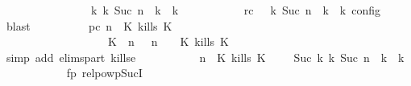 \begin{isabellebody}
\ \ \ \ \ \ \ \ \ \ \ \ \ \ \ \ {\isasymhookrightarrow}\isactrlbsup k\isactrlesup \ {\isacharparenleft}{\isasymGamma}\isactrlsub k{\isacharcomma}\ Suc\ n\ {\isasymturnstile}\ {\isasymPsi}\isactrlsub k\ {\isasymtriangleright}\ {\isasymPhi}\isactrlsub k{\isacharparenright}{\isacharparenright}{\isacartoucheclose}\isanewline
\ \ \ \ \ \ \ \ \ \ \ rc{\isacharcolon}{\isacartoucheopen}{\isasymrho}\ {\isasymin}\ {\isasymlbrakk}\ {\isasymGamma}\isactrlsub k{\isacharcomma}\ Suc\ n\ {\isasymturnstile}\ {\isasymPsi}\isactrlsub k\ {\isasymtriangleright}\ {\isasymPhi}\isactrlsub k\ {\isasymrbrakk}\isactrlsub c\isactrlsub o\isactrlsub n\isactrlsub f\isactrlsub i\isactrlsub g{\isacartoucheclose}\ \isamarkupfalse%
\ blast\isanewline
\ \ \ \ \ \ \ \ \isamarkupfalse%
\ pc{\isacharcolon}{\isacartoucheopen}{\isacharparenleft}{\isasymGamma}{\isacharcomma}\ n\ {\isasymturnstile}\ {\isacharparenleft}K\ kills\ K\ {\isacharhash}\ {\isasymPsi}\ {\isasymtriangleright}\ {\isasymPhi}{\isacharparenright}\isanewline
\ \ \ \ \ \ \ \ \ \ \ \ \ \ \ \ \ \ {\isasymhookrightarrow}\ {\isacharparenleft}{\isacharparenleft}{\isacharparenleft}K\ {\isasymnot}{\isasymUp}\ n{\isacharparenright}\ {\isacharhash}\ {\isasymGamma}{\isacharparenright}{\isacharcomma}\ n\ {\isasymturnstile}\ {\isasymPsi}\ {\isasymtriangleright}\ {\isacharparenleft}{\isacharparenleft}K\ kills\ K\ {\isacharhash}\ {\isasymPhi}{\isacharparenright}{\isacharparenright}{\isacartoucheclose}\isanewline
\ \ \ \ \ \ \ \ \ \ \isamarkupfalse%
\ {\isacharparenleft}simp\ add{\isacharcolon}\ elims{\isacharunderscore}part\ kills{\isacharunderscore}e{}{\isacharparenright}\isanewline
\ \ \ \ \ \ \ \ \isamarkupfalse%
\ {\isacartoucheopen}{\isacharparenleft}{\isasymGamma}{\isacharcomma}\ n\ {\isasymturnstile}\ {\isacharparenleft}K\ kills\ K\ {\isacharhash}\ {\isasymPsi}\ {\isasymtriangleright}\ {\isasymPhi}{\isacharparenright}\ {\isasymhookrightarrow}\isactrlbsup Suc\ k\isactrlesup \ {\isacharparenleft}{\isasymGamma}\isactrlsub k{\isacharcomma}\ Suc\ n\ {\isasymturnstile}\ {\isasymPsi}\isactrlsub k\ {\isasymtriangleright}\ {\isasymPhi}\isactrlsub k{\isacharparenright}{\isacartoucheclose}\isanewline
\ \ \ \ \ \ \ \ \ \ \isamarkupfalse%
\ fp\ relpowp{\isacharunderscore}Suc{\isacharunderscore}I{}\ \isamarkupfalse%

\end{isabellebody}
